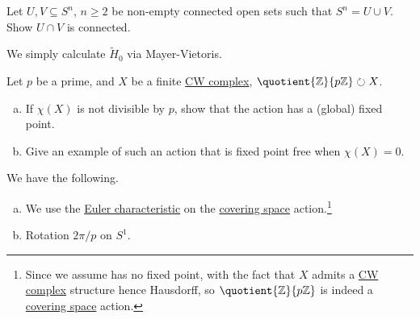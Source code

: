 \begin{exercise}[QR Jan. 2016]
	Let \(U, V\subseteq S^n\), \(n \geq 2\) be non-empty connected open sets such that \(S^n = U \cup V\). Show \(U \cap V\) is
	connected.
\end{exercise}
\begin{answer}
	We simply calculate \(\widetilde{H} _0\) via Mayer-Vietoris.
\end{answer}

\begin{exercise}[QR Jan. 2016]
	Let \(p\) be a prime, and \(X\) be a finite \hyperref[def:CW-Complex]{CW complex}, \(\quotient{\mathbb{Z} }{p \mathbb{Z} }\circlearrowright X \).

	\begin{enumerate}[(a)]
		\item If \(\chi (X)\) is not divisible by \(p\), show that the action has a (global) fixed point.
		\item Give an example of such an action that is fixed point free when \(\chi (X) = 0\).
	\end{enumerate}
\end{exercise}
\begin{answer}
	We have the following.
	\begin{enumerate}[(a)]
		\item We use the \hyperref[def:Euler-characteristic]{Euler characteristic} on the \hyperref[def:covering-space]{covering space} action.\footnote{Since we assume
			      has no fixed point, with the fact that \(X\) admits a \hyperref[def:CW-Complex]{CW complex}
			      structure hence Hausdorff, so \(\quotient{\mathbb{Z} }{p\mathbb{Z} } \) is indeed a \hyperref[def:covering-space]{covering space} action.}
		\item Rotation \(2\pi / p\) on \(S^1\).
	\end{enumerate}
\end{answer}